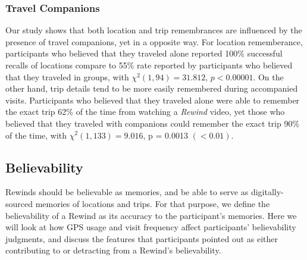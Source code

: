 \documentclass{sigchi}
\begin{document}
\subsubsection{Travel Companions}
Our study shows that both location and trip remembrances are influenced by the presence of travel companions, yet in a opposite way. For location rememberance, participants who believed that they traveled alone reported 100\% successful recalls of locations compare to 55\% rate reported by participants who believed that they traveled in groups, with $\chi^2(1,94) = 31.812$, $p < 0.00001$. On the other hand, trip details tend to be more easily remembered during accompanied visits. Participants who believed that they traveled alone were able to remember the exact trip 62\% of the time from watching a \textit{Rewind} video, yet those who believed that they traveled with companions could remember the exact trip 90\% of the time, with $\chi^2(1,133) = 9.016$, p = 0.0013 $(< 0.01)$.




\subsection{Believability}
Rewinds should be believable as memories, and be able to serve as digitally-sourced memories of locations and trips. For that purpose, we define the believability of a Rewind as its accuracy to the participant's memories. Here we will look at how GPS usage and visit frequency affect participants' believability judgments, and discuss the features that participants pointed out as either contributing to or detracting from a Rewind's believability.
\end{document}
